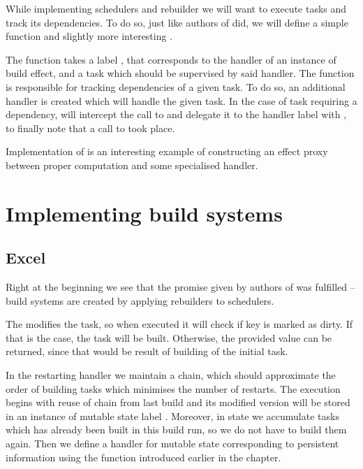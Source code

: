 While implementing schedulers and rebuilder we will want to execute tasks and track its dependencies. To do so, just like authors of \BSaLC{} did, we will define a simple function  and slightly more interesting .



The  function takes a label , that corresponds to the handler of an instance of build effect, and a task which should be supervised by said handler. The  function is responsible for tracking dependencies of a given task. To do so, an additional handler  is created which will handle the given task. In the case of task requiring a dependency,  will intercept the call to  and delegate it to the handler label with , to finally note that a call to  took place.

Implementation of  is an interesting example of constructing an effect proxy between proper computation and some specialised handler.

\pagebreak

\section{Implementing build systems}

\subsection{Excel}



Right at the beginning we see that the promise given by authors of \BSaLC{} was fulfilled -- build systems are created by applying rebuilders to schedulers.

The  modifies the task, so when executed it will check if key is marked as dirty. If that is the case, the task will be built. Otherwise, the provided value can be returned, since that would be result of building of the initial task.



In the restarting handler we maintain a chain, which should approximate the order of building tasks which minimises the number of restarts. The execution begins with reuse of chain from last build and its modified version will be stored in an instance of mutable state label . Moreover, in  state we accumulate tasks which has already been built in this build run, so we do not have to build them again. Then we define a handler for mutable state corresponding to persistent information using the  function introduced earlier in the chapter.

